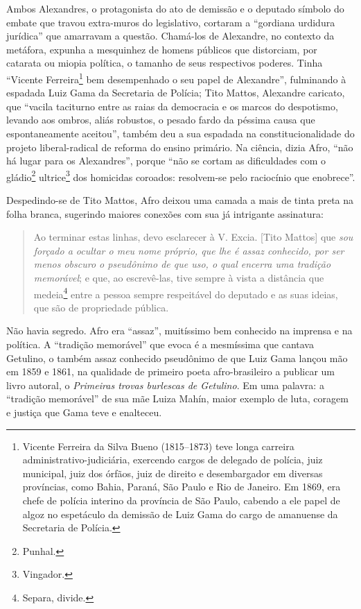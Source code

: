 Ambos Alexandres, o protagonista do ato de demissão e o deputado
símbolo do embate que travou extra-muros do legislativo, cortaram a
``gordiana urdidura jurídica'' que amarravam a questão. Chamá-los de
Alexandre, no contexto da metáfora, expunha a mesquinhez de
homens públicos que distorciam, por catarata ou miopia política, o
tamanho de seus respectivos poderes. Tinha ``Vicente Ferreira\footnote{Vicente Ferreira da Silva Bueno (1815--1873) teve longa carreira
  administrativo-judiciária, exercendo cargos de delegado de polícia,
  juiz municipal, juiz dos órfãos, juiz de direito e desembargador em
  diversas províncias, como Bahia, Paraná, São Paulo e Rio de Janeiro.
  Em 1869, era chefe de polícia interino da província de São Paulo,
  cabendo a ele papel de algoz no espetáculo da demissão de Luiz Gama do
  cargo de amanuense da Secretaria de Polícia.} bem desempenhado o seu
papel de Alexandre'', fulminando à espadada Luiz Gama da Secretaria de
Polícia; Tito Mattos, Alexandre caricato, que ``vacila taciturno entre as
raias da democracia e os marcos do despotismo, levando aos ombros, aliás
robustos, o pesado fardo da péssima causa que espontaneamente aceitou'',
também deu a sua espadada na constitucionalidade do projeto
liberal-radical de reforma do ensino primário. Na ciência, dizia
Afro, ``não há lugar para os Alexandres'', porque ``não se cortam as
dificuldades com o gládio\footnote{Punhal.} ultrice\footnote{Vingador.} dos homicidas coroados: resolvem-se pelo raciocínio que
enobrece''.

Despedindo-se de Tito Mattos, Afro deixou uma camada a mais de
tinta preta na folha branca, sugerindo maiores conexões com sua já
intrigante assinatura:

\begin{quote}
Ao terminar estas linhas, devo esclarecer à V. Excia. {[}Tito Mattos{]}
que \textit{sou forçado a ocultar o meu nome próprio, que lhe é assaz
conhecido, por ser menos obscuro o pseudônimo de que uso, o qual encerra
uma tradição memorável}; e que, ao escrevê-las, tive sempre à vista a
distância que medeia\footnote{Separa, divide.} entre a pessoa sempre
respeitável do deputado e as suas ideias, que são de propriedade
pública.
\end{quote}

Não havia segredo. Afro era ``assaz'', muitíssimo bem conhecido na
imprensa e na política. A ``tradição memorável'' que evoca é a mesmíssima
que cantava Getulino, o também assaz conhecido pseudônimo de que
Luiz Gama lançou mão em 1859 e 1861, na qualidade de primeiro poeta
afro-brasileiro a publicar um livro autoral, o \emph{Primeiras trovas
burlescas de Getulino}. Em uma palavra: a ``tradição memorável'' de sua
mãe Luiza Mahín, maior exemplo de luta, coragem e justiça que Gama teve
e enalteceu.


